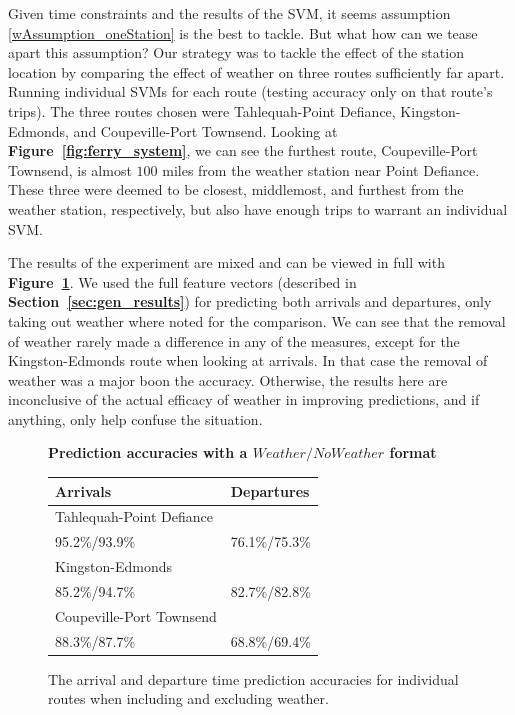 \documentclass[11pt]{article} %
\begin{document}
Given time constraints and the results of the SVM, it seems assumption 
\ref{wAssumption_oneStation} is the best to tackle. But what how can we tease
apart this assumption? Our strategy was to tackle the effect of the station
location by comparing the effect of weather on three routes sufficiently far apart.
Running individual SVMs for each route (testing accuracy only on that route's 
trips). The three routes chosen were Tahlequah-Point Defiance, Kingston-Edmonds,
and Coupeville-Port Townsend. Looking at \textbf{Figure~\ref{fig:ferry_system}},
we can see the furthest route, Coupeville-Port Townsend, is almost $100$ miles
from the weather station near Point Defiance. These three were deemed to be 
closest, middlemost, and furthest from the weather station, respectively, but also 
have enough trips to warrant an individual SVM. 

The results of the experiment are mixed and can be viewed in full with 
\textbf{Figure~\ref{fig:weatherExperiment}}. We used the full feature vectors 
(described in \textbf{Section~\ref{sec:gen_results}}) for 
predicting both arrivals and departures, only taking out weather where noted
for the comparison. We can see that the removal of weather rarely made a difference
in any of the measures, except for the Kingston-Edmonds route when looking at 
arrivals. In that case the removal of weather was a major boon the accuracy. 
Otherwise, the results here are inconclusive of the actual efficacy of weather
in improving predictions, and if anything, only help confuse the situation.

\begin{figure}
    \centering
    \textbf{Prediction accuracies with a $Weather/NoWeather$ format}

    \begin{tabular}{ll}
        \textbf{Arrivals} & \textbf{Departures}\\
        \hline
        Tahlequah-Point Defiance    & \\
        95.2\%/93.9\% & 76.1\%/75.3\% \\
        Kingston-Edmonds    & \\
        85.2\%/94.7\% & 82.7\%/82.8\% \\
        Coupeville-Port Townsend     & \\
        88.3\%/87.7\% & 68.8\%/69.4\% 
    \end{tabular}
    \caption{The arrival and departure time prediction accuracies for individual 
        routes when including and excluding weather.}
    \label{fig:weatherExperiment}
\end{figure}
\end{document}
